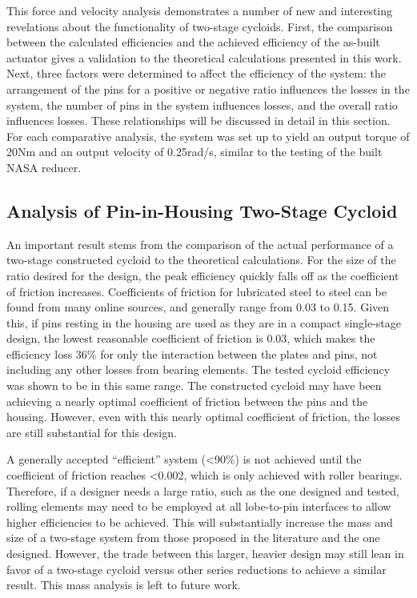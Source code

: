 This force and velocity analysis demonstrates a number of new and interesting revelations about the functionality of two-stage cycloids. First, the comparison between the calculated efficiencies and the achieved efficiency of the as-built actuator gives a validation to the theoretical calculations presented in this work. Next, three factors were determined to affect the efficiency of the system: the arrangement of the pins for a positive or negative ratio influences the losses in the system, the number of pins in the system influences losses, and the overall ratio influences losses. These relationships will be discussed in detail in this section. For each comparative analysis, the system was set up to yield an output torque of 20Nm and an output velocity of 0.25rad/s, similar to the testing of the built NASA reducer.

\subsection{Analysis of Pin-in-Housing Two-Stage Cycloid} \label{ch:dual:discussion:actual}

An important result stems from the comparison of the actual performance of a two-stage constructed cycloid to the theoretical calculations. For the size of the ratio desired for the design, the peak efficiency quickly falls off as the coefficient of friction increases. Coefficients of friction for lubricated steel to steel can be found from many online sources, and generally range from 0.03 to 0.15. Given this, if pins resting in the housing are used as they are in a compact single-stage design, the lowest reasonable coefficient of friction is 0.03, which makes the efficiency loss 36\% for only the interaction between the plates and pins, not including any other losses from bearing elements. The tested cycloid efficiency was shown to be in this same range. The constructed cycloid may have been achieving a nearly optimal coefficient of friction between the pins and the housing. However, even with this nearly optimal coefficient of friction, the losses are still substantial for this design. 

A generally accepted ``efficient'' system (\textless90\%) is not achieved until the coefficient of friction reaches \textless0.002, which is only achieved with roller bearings. Therefore, if a designer needs a large ratio, such as the one designed and tested, rolling elements may need to be employed at all lobe-to-pin interfaces to allow higher efficiencies to be achieved. This will substantially increase the mass and size of a two-stage system from those proposed in the literature and the one designed. However, the trade between this larger, heavier design may still lean in favor of a two-stage cycloid versus other series reductions to achieve a similar result. This mass analysis is left to future work. 

